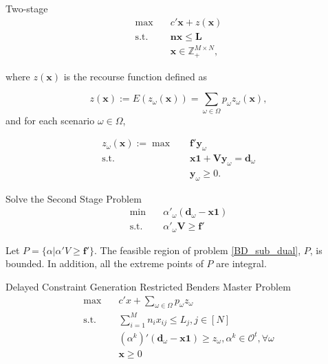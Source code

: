 \begin{frame}{Two-stage}
  \begin{equation}\label{BD_master}
    \begin{aligned}
  \max \quad & c{'} \mathbf{x}+ z(\mathbf{x}) \\
  \text {s.t.} \quad & \mathbf{n} \mathbf{x} \leq \mathbf{L} \\
  & \mathbf{x} \in \mathbb{Z}_{+}^{M \times N},
  \end{aligned}
  \end{equation}

  where $z(\mathbf{x})$ is the recourse function defined as 

$$z(\mathbf{x}) := E(z_{\omega}(\mathbf{x})) = \sum_{\omega \in \Omega} p_{\omega} z_{\omega}(\mathbf{x}),$$ and for each scenario $\omega \in \Omega$, 

  \begin{equation}\label{BD_sub}
    \begin{aligned}
      z_{\omega}(\mathbf{x}) := \max \quad & \mathbf{f}{'} \mathbf{y}_{\omega} \\
      \text {s.t.} \quad & \mathbf{x} \mathbf{1} + \mathbf{V} \mathbf{y}_{\omega} = \mathbf{d}_{\omega} \\
       & \mathbf{y}_{\omega} \geq 0.
    \end{aligned}
    \end{equation}
\end{frame}

\begin{frame}{Solve the Second Stage Problem}
  \begin{equation}\label{BD_sub_dual}
    \begin{aligned}
      \min \quad & \alpha{'}_{\omega} (\mathbf{d}_{\omega}- \mathbf{x} \mathbf{1}) \\
      \text {s.t.} \quad & \alpha{'}_{\omega} \mathbf{V} \geq \mathbf{f}{'}
    \end{aligned}
    \end{equation}

    Let $P = \{\alpha|\alpha{'}V \geq \mathbf{f}{'}\}$. 
    The feasible region of problem \eqref{BD_sub_dual}, $P$, is bounded. In addition, all the extreme points of $P$ are integral.
\end{frame}

\begin{frame}{Delayed Constraint Generation}
  Restricted Benders Master Problem
  \begin{equation}\label{BD_master2}
    \begin{aligned}
      \max \quad & c{'} x + \sum_{\omega \in \Omega} p_{\omega} z_{\omega} \\
      \text {s.t.} \quad & \sum_{i=1}^{M} n_{i} x_{ij} \leq L_j, j \in [N] \\
      & (\alpha^{k}){'}(\mathbf{d}_{\omega}- \mathbf{x} \mathbf{1}) \geq z_{\omega}, \alpha^k \in \mathcal{O}^{t}, \forall \omega \\
       & \mathbf{x} \geq 0
    \end{aligned}
  \end{equation} 
\end{frame}

